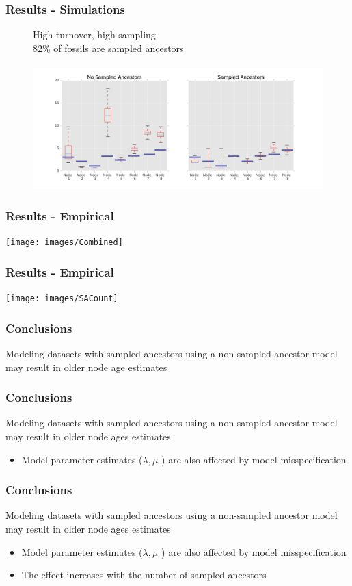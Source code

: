 \documentclass[]{beamer}
\begin{document}
\begin{frame}
\frametitle{Results -  Simulations}
\begin{center}
\begin{figure}
High turnover, high sampling  \\
82\% of fossils are sampled ancestors \\
\mathlarger{\mathlarger{\mathlarger{\boldsymbol{\lambda}}}} \mu \psi   \rho \\
\includegraphics[scale=0.4]{images/HighTurnHighSampnodes}
\end{figure}
\end{center}
\end{frame}


\begin{frame}
\frametitle{Results - Empirical}
\texttt{[image: images/Combined]}
\end{frame}

\begin{frame}
\frametitle{Results - Empirical}
\texttt{[image: images/SACount]}
\end{frame}


\begin{frame}
\frametitle{Conclusions}
Modeling datasets with sampled ancestors using a non-sampled ancestor model may result in older node age estimates
\end{frame}

\begin{frame}
\frametitle{Conclusions}
Modeling datasets with sampled ancestors using a non-sampled ancestor model may result in older node ages estimates
\begin{itemize}
\item Model parameter estimates (\(\lambda, \mu \) ) are also affected by model misspecification
\end{itemize}
\end{frame}

\begin{frame}
\frametitle{Conclusions}
Modeling datasets with sampled ancestors using a non-sampled ancestor model may result in older node ages estimates
\begin{itemize}
\item Model parameter estimates (\(\lambda, \mu \) ) are also affected by model misspecification
\item The effect increases with the number of sampled ancestors
\end{itemize}
\end{frame}
\end{document}
